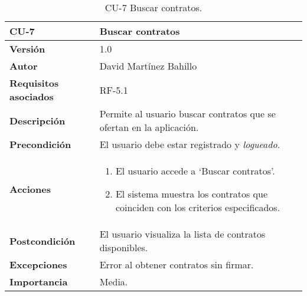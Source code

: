 \begin{table}[p]
	\centering
	\begin{tabularx}{\linewidth}{ p{} p{} }
		\toprule
		\textbf{CU-7}    & \textbf{Buscar contratos}\\
		\midrule
		\textbf{Versión}              & 1.0    \\
		\textbf{Autor}                & David Martínez Bahillo \\
		\textbf{Requisitos asociados} & RF-5.1 \\
		\textbf{Descripción}          & Permite al usuario buscar contratos que se ofertan en la aplicación. \\
		\textbf{Precondición}         & El usuario debe estar registrado y \textit{logueado}. \\
		\textbf{Acciones}             &
		\begin{enumerate}
			\def\labelenumi{\arabic{enumi}.}
			\tightlist
			\item El usuario accede a `Buscar contratos'.
			\item El sistema muestra los contratos que coinciden con los criterios especificados.
		\end{enumerate}\\
		\textbf{Postcondición}        & El usuario visualiza la lista de contratos disponibles. \\
		\textbf{Excepciones}          & Error al obtener contratos sin firmar. \\
		\textbf{Importancia}          & Media. \\
		\bottomrule
	\end{tabularx}
	\caption{CU-7 Buscar contratos.}
\end{table}


